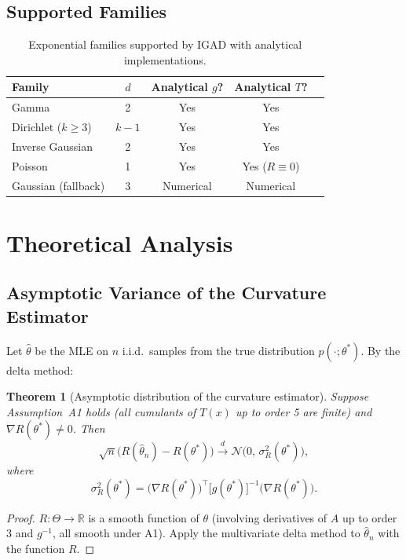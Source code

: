 \documentclass[12pt]{article}
\newtheorem{theorem}{Theorem}
\begin{document}
\subsection{Supported Families}

\begin{table}[h]
\centering
\caption{Exponential families supported by IGAD with analytical implementations.}
\begin{tabular}{lcccc}
\toprule
Family & $d$ & Analytical $g$? & Analytical $T$? \\
\midrule
Gamma & 2 & Yes & Yes \\
Dirichlet ($k\geq 3$) & $k-1$ & Yes & Yes \\
Inverse Gaussian & 2 & Yes & Yes \\
Poisson & 1 & Yes & Yes ($R\equiv 0$) \\
Gaussian (fallback) & 3 & Numerical & Numerical \\
\bottomrule
\end{tabular}
\end{table}

\section{Theoretical Analysis}

\subsection{Asymptotic Variance of the Curvature Estimator}

Let $\hat{\theta}$ be the MLE on $n$ i.i.d.\ samples from the true distribution
$p(\cdot;\theta^*)$. By the delta method:

\begin{theorem}[Asymptotic distribution of the curvature estimator]
\label{thm:delta}
Suppose Assumption~A1 holds (all cumulants of $T(x)$ up to order 5 are finite)
and $\nabla R(\theta^*) \neq 0$. Then
\[
  \sqrt{n}\bigl(R(\hat{\theta}_n) - R(\theta^*)\bigr) \xrightarrow{d}
  \mathcal{N}\!\bigl(0,\,\sigma^2_R(\theta^*)\bigr),
\]
where
\[
  \sigma^2_R(\theta^*) = \bigl(\nabla R(\theta^*)\bigr)^\top
                          \bigl[g(\theta^*)\bigr]^{-1}
                          \bigl(\nabla R(\theta^*)\bigr).
\]
\end{theorem}

\begin{proof}
$R:\Theta\to\mathbb{R}$ is a smooth function of $\theta$ (involving derivatives
of $A$ up to order 3 and $g^{-1}$, all smooth under A1). Apply the multivariate
delta method to $\hat{\theta}_n$ with the function $R$.
\end{proof}
\end{document}
